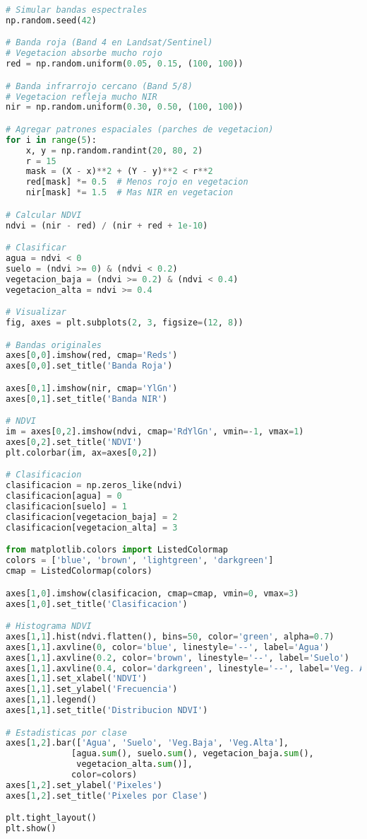 \documentclass[11pt,a4paper]{article}
\begin{document}
\begin{lstlisting}[language=Python]
# Simular bandas espectrales
np.random.seed(42)

# Banda roja (Band 4 en Landsat/Sentinel)
# Vegetacion absorbe mucho rojo
red = np.random.uniform(0.05, 0.15, (100, 100))

# Banda infrarrojo cercano (Band 5/8)
# Vegetacion refleja mucho NIR
nir = np.random.uniform(0.30, 0.50, (100, 100))

# Agregar patrones espaciales (parches de vegetacion)
for i in range(5):
    x, y = np.random.randint(20, 80, 2)
    r = 15
    mask = (X - x)**2 + (Y - y)**2 < r**2
    red[mask] *= 0.5  # Menos rojo en vegetacion
    nir[mask] *= 1.5  # Mas NIR en vegetacion

# Calcular NDVI
ndvi = (nir - red) / (nir + red + 1e-10)

# Clasificar
agua = ndvi < 0
suelo = (ndvi >= 0) & (ndvi < 0.2)
vegetacion_baja = (ndvi >= 0.2) & (ndvi < 0.4)
vegetacion_alta = ndvi >= 0.4

# Visualizar
fig, axes = plt.subplots(2, 3, figsize=(12, 8))

# Bandas originales
axes[0,0].imshow(red, cmap='Reds')
axes[0,0].set_title('Banda Roja')

axes[0,1].imshow(nir, cmap='YlGn')
axes[0,1].set_title('Banda NIR')

# NDVI
im = axes[0,2].imshow(ndvi, cmap='RdYlGn', vmin=-1, vmax=1)
axes[0,2].set_title('NDVI')
plt.colorbar(im, ax=axes[0,2])

# Clasificacion
clasificacion = np.zeros_like(ndvi)
clasificacion[agua] = 0
clasificacion[suelo] = 1
clasificacion[vegetacion_baja] = 2
clasificacion[vegetacion_alta] = 3

from matplotlib.colors import ListedColormap
colors = ['blue', 'brown', 'lightgreen', 'darkgreen']
cmap = ListedColormap(colors)

axes[1,0].imshow(clasificacion, cmap=cmap, vmin=0, vmax=3)
axes[1,0].set_title('Clasificacion')

# Histograma NDVI
axes[1,1].hist(ndvi.flatten(), bins=50, color='green', alpha=0.7)
axes[1,1].axvline(0, color='blue', linestyle='--', label='Agua')
axes[1,1].axvline(0.2, color='brown', linestyle='--', label='Suelo')
axes[1,1].axvline(0.4, color='darkgreen', linestyle='--', label='Veg. Alta')
axes[1,1].set_xlabel('NDVI')
axes[1,1].set_ylabel('Frecuencia')
axes[1,1].legend()
axes[1,1].set_title('Distribucion NDVI')

# Estadisticas por clase
axes[1,2].bar(['Agua', 'Suelo', 'Veg.Baja', 'Veg.Alta'],
             [agua.sum(), suelo.sum(), vegetacion_baja.sum(), 
              vegetacion_alta.sum()],
             color=colors)
axes[1,2].set_ylabel('Pixeles')
axes[1,2].set_title('Pixeles por Clase')

plt.tight_layout()
plt.show()
\end{lstlisting}
\end{document}
